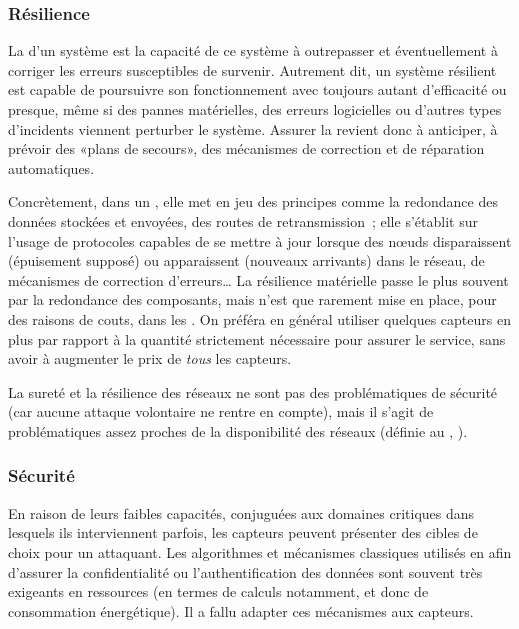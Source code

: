         \subsubsection{Résilience}
La \resilience d'un système est la capacité de ce système à outrepasser et éventuellement à corriger les erreurs susceptibles de survenir.
Autrement dit, un système résilient est capable de poursuivre son fonctionnement avec toujours autant d'efficacité ou presque, même si des pannes matérielles, des erreurs logicielles ou d'autres types d'incidents viennent perturber le système.
Assurer la \resilience revient donc à anticiper, à prévoir des «plans de secours», des mécanismes de correction et de réparation automatiques.

Concrètement, dans un \rcsfs, elle met en jeu des principes comme la redondance des données stockées et envoyées, des routes de retransmission~\cite{SP10}; elle s'établit sur l'usage de protocoles capables de se mettre à jour lorsque des nœuds disparaissent (épuisement supposé) ou apparaissent (nouveaux arrivants) dans le réseau, de mécanismes de correction d'erreurs…
La résilience matérielle passe le plus souvent par la redondance des composants, mais n'est que rarement mise en place, pour des raisons de couts, dans les \rcs.
On préféra en général utiliser quelques capteurs en plus par rapport à la quantité strictement nécessaire pour assurer le service, sans avoir à augmenter le prix de \emph{tous} les capteurs.

La sureté et la résilience des réseaux ne sont pas des problématiques de sécurité (car aucune attaque volontaire ne rentre en compte), mais il s'agit de problématiques assez proches de la disponibilité des réseaux (définie au , ).

        \subsubsection{Sécurité}
En raison de leurs faibles capacités, conjuguées aux domaines critiques dans lesquels ils interviennent parfois, les capteurs peuvent présenter des cibles de choix pour un attaquant.
Les algorithmes et mécanismes classiques utilisés en  afin d'assurer la confidentialité ou l'authentification des données sont souvent très exigeants en ressources (en termes de calculs notamment, et donc de consommation énergétique).
Il a fallu adapter ces mécanismes aux capteurs.

